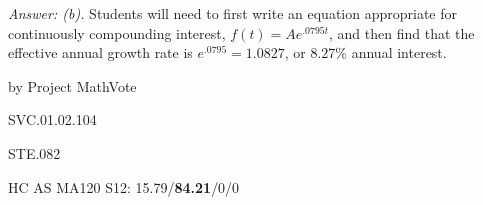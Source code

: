 {\it Answer:  (b).}  Students will need to first write an equation appropriate for continuously compounding interest, $f(t)=Ae^{.0795t}$, and then find that the effective annual growth rate is $e^{.0795}=1.0827$, or $8.27\%$ annual interest.

\medskip
by Project MathVote

SVC.01.02.104

STE.082

HC AS MA120 S12: 15.79/{\bf84.21}/0/0  \\

